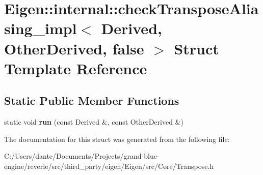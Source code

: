 \hypertarget{struct_eigen_1_1internal_1_1check_transpose_aliasing__impl_3_01_derived_00_01_other_derived_00_01false_01_4}{}\section{Eigen\+::internal\+::check\+Transpose\+Aliasing\+\_\+impl$<$ Derived, Other\+Derived, false $>$ Struct Template Reference}
\label{struct_eigen_1_1internal_1_1check_transpose_aliasing__impl_3_01_derived_00_01_other_derived_00_01false_01_4}
\subsection*{Static Public Member Functions}
\begin{DoxyCompactItemize}
\item 
\mbox{\label{struct_eigen_1_1internal_1_1check_transpose_aliasing__impl_3_01_derived_00_01_other_derived_00_01false_01_4_a9b124ec8236f4729eeb12d619da434df}} 
static void {\bfseries run} (const Derived \&, const Other\+Derived \&)
\end{DoxyCompactItemize}


The documentation for this struct was generated from the following file\+:\begin{DoxyCompactItemize}
\item 
C\+:/\+Users/dante/\+Documents/\+Projects/grand-\/blue-\/engine/reverie/src/third\+\_\+party/eigen/\+Eigen/src/\+Core/Transpose.\+h\end{DoxyCompactItemize}
